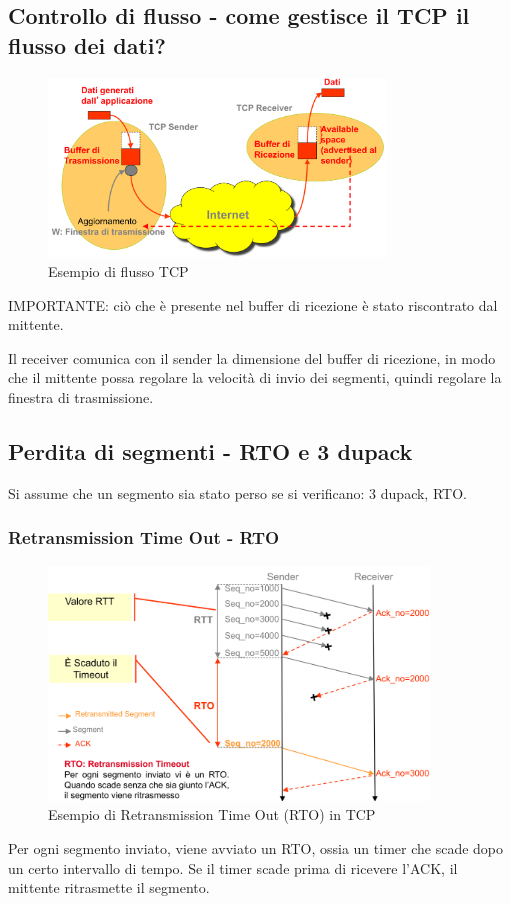 \subsection{Controllo di flusso - come gestisce il TCP il flusso dei dati?}

\begin{figure}[h!]
    \centering
    \includegraphics[width=0.8\textwidth]{images/tcpflusso.png}
    \caption{Esempio di flusso TCP}
    \label{fig:tcpflusso}
\end{figure}


IMPORTANTE: ciò che è presente nel buffer di ricezione è stato riscontrato dal mittente.

Il receiver comunica con il sender la dimensione del buffer di ricezione, in modo che il mittente possa regolare la velocità di invio dei segmenti, quindi regolare la finestra di trasmissione.


\newpage
\subsection{Perdita di segmenti - RTO e 3 dupack} 
Si assume che un segmento sia stato perso se si verificano: 3 dupack, RTO.

 \subsubsection{Retransmission Time Out - RTO}
\begin{figure}[h!]
    \centering
    \includegraphics[width=0.9\textwidth]{images/rtotcp.png}
    \caption{Esempio di Retransmission Time Out (RTO) in TCP}
    \label{fig:rtotcp}
\end{figure}
Per ogni segmento inviato, viene avviato un RTO, ossia un timer che scade dopo un certo intervallo di tempo. Se il timer scade prima di ricevere l'ACK, il mittente ritrasmette il segmento.
